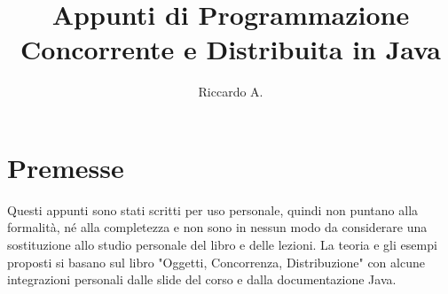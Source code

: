 

\author{Riccardo A.}
\title{Appunti di Programmazione Concorrente e Distribuita in Java}



\maketitle

\section*{Premesse}
Questi appunti sono stati scritti per uso personale, quindi non puntano alla formalità, né alla completezza e non sono in nessun modo da considerare una sostituzione allo studio personale del libro e delle lezioni. La teoria e gli esempi proposti si basano sul libro "Oggetti, Concorrenza, Distribuzione" con alcune integrazioni personali dalle slide del corso e dalla documentazione Java.

\tableofcontents




